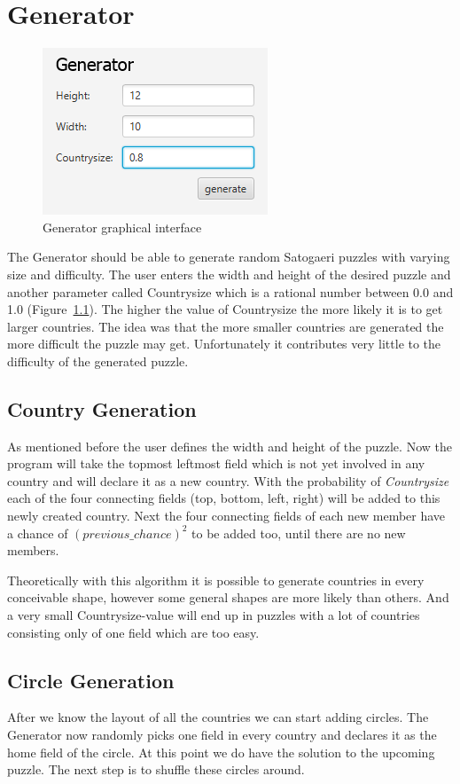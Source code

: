 \chapter{Generator} \label{The Generator}
\begin{figure}
  \centering
  \includegraphics[scale=1]{Pictures/generator.png} 
  \caption{Generator graphical interface}
  \label{fig:generator}
\end{figure}
The Generator should be able to generate random Satogaeri puzzles with varying size and difficulty. The user enters the width and height of the desired puzzle and another parameter called Countrysize which is a rational number between 0.0 and 1.0 (Figure~\ref{fig:generator}). The higher the value of Countrysize the more likely it is to get larger countries. The idea was that the more smaller countries are generated the more difficult the puzzle may get. Unfortunately it contributes very little to the difficulty of the generated puzzle.

\section{Country Generation}
As mentioned before the user defines the width and height of the puzzle. Now the program will take the topmost leftmost field which is not yet involved in any country and will declare it as a new country. With the probability of \emph{Countrysize} each of the four connecting fields (top, bottom, left, right) will be added to this newly created country. Next the four connecting fields of each new member have a chance of \emph{\((previous\_chance)^2\)} to be added too, until there are no new members.

Theoretically with this algorithm it is possible to generate countries in every conceivable shape, however some general shapes are more likely than others. And a very small Countrysize-value will end up in puzzles with a lot of countries consisting only of one field which are too easy.

\section{Circle Generation}
After we know the layout of all the countries we can start adding circles. The Generator now randomly picks one field in every country and declares it as the home field of the circle. At this point we do have the solution to the upcoming puzzle. The next step is to shuffle these circles around.

